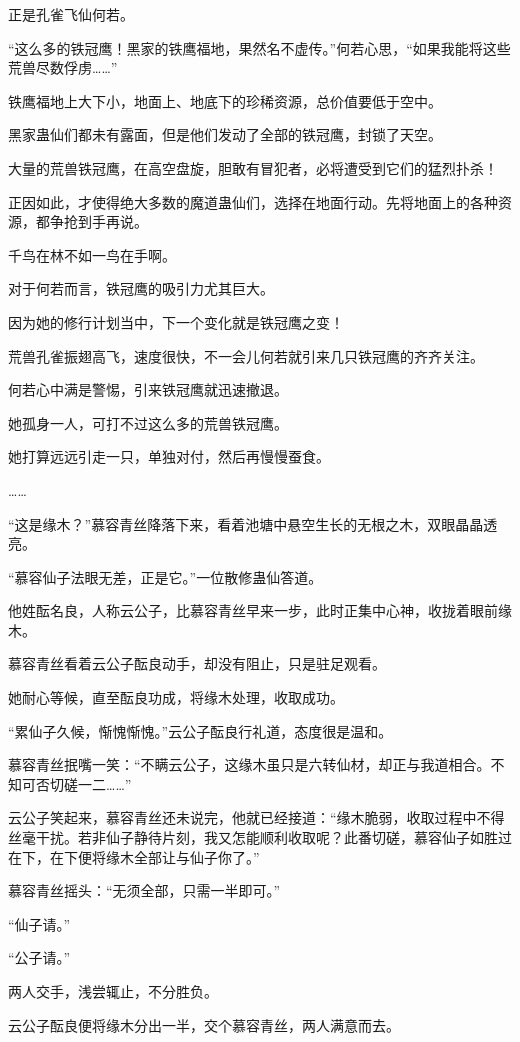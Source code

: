 \begin{this_body}
正是孔雀飞仙何若。

“这么多的铁冠鹰！黑家的铁鹰福地，果然名不虚传。”何若心思，“如果我能将这些荒兽尽数俘虏……”

铁鹰福地上大下小，地面上、地底下的珍稀资源，总价值要低于空中。

黑家蛊仙们都未有露面，但是他们发动了全部的铁冠鹰，封锁了天空。

大量的荒兽铁冠鹰，在高空盘旋，胆敢有冒犯者，必将遭受到它们的猛烈扑杀！

正因如此，才使得绝大多数的魔道蛊仙们，选择在地面行动。先将地面上的各种资源，都争抢到手再说。

千鸟在林不如一鸟在手啊。

对于何若而言，铁冠鹰的吸引力尤其巨大。

因为她的修行计划当中，下一个变化就是铁冠鹰之变！

荒兽孔雀振翅高飞，速度很快，不一会儿何若就引来几只铁冠鹰的齐齐关注。

何若心中满是警惕，引来铁冠鹰就迅速撤退。

她孤身一人，可打不过这么多的荒兽铁冠鹰。

她打算远远引走一只，单独对付，然后再慢慢蚕食。

……

“这是缘木？”慕容青丝降落下来，看着池塘中悬空生长的无根之木，双眼晶晶透亮。

“慕容仙子法眼无差，正是它。”一位散修蛊仙答道。

他姓酝名良，人称云公子，比慕容青丝早来一步，此时正集中心神，收拢着眼前缘木。

慕容青丝看着云公子酝良动手，却没有阻止，只是驻足观看。

她耐心等候，直至酝良功成，将缘木处理，收取成功。

“累仙子久候，惭愧惭愧。”云公子酝良行礼道，态度很是温和。

慕容青丝抿嘴一笑：“不瞒云公子，这缘木虽只是六转仙材，却正与我道相合。不知可否切磋一二……”

云公子笑起来，慕容青丝还未说完，他就已经接道：“缘木脆弱，收取过程中不得丝毫干扰。若非仙子静待片刻，我又怎能顺利收取呢？此番切磋，慕容仙子如胜过在下，在下便将缘木全部让与仙子你了。”

慕容青丝摇头：“无须全部，只需一半即可。”

“仙子请。”

“公子请。”

两人交手，浅尝辄止，不分胜负。

云公子酝良便将缘木分出一半，交个慕容青丝，两人满意而去。


\end{this_body}
